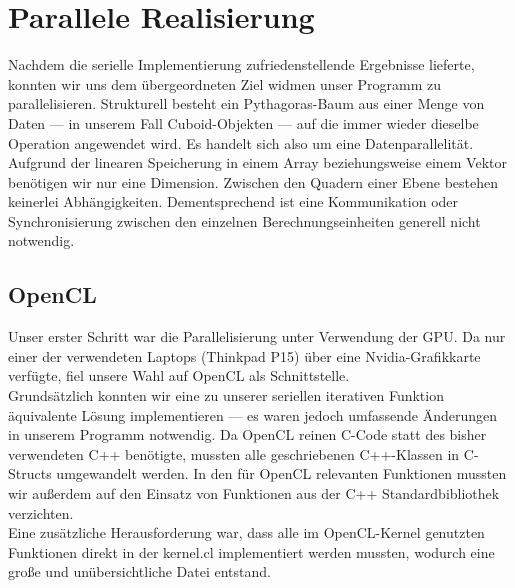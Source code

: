 \section{Parallele Realisierung}
Nachdem die serielle Implementierung zufriedenstellende Ergebnisse lieferte, konnten wir uns dem übergeordneten Ziel widmen unser 
Programm zu parallelisieren.\newline
Strukturell besteht ein Pythagoras-Baum aus einer Menge von Daten --- in unserem Fall Cuboid-Objekten ---
auf die immer wieder dieselbe Operation angewendet wird. Es handelt sich also um eine Datenparallelität. Aufgrund der linearen Speicherung
in einem Array beziehungsweise einem Vektor benötigen wir nur eine Dimension.\newline
Zwischen den Quadern einer Ebene bestehen keinerlei Abhängigkeiten. Dementsprechend ist eine Kommunikation oder Synchronisierung zwischen den einzelnen
Berechnungseinheiten generell nicht notwendig. 

\subsection{OpenCL}
\vspace{-0.25cm}
Unser erster Schritt war die Parallelisierung unter Verwendung der GPU. Da nur einer der verwendeten Laptops (Thinkpad P15) über eine 
Nvidia-Grafikkarte verfügte, fiel unsere Wahl auf OpenCL als Schnittstelle.\\
Grundsätzlich konnten wir eine zu unserer seriellen iterativen Funktion äquivalente Lösung implementieren --- es waren jedoch umfassende
Änderungen in unserem Programm notwendig. Da OpenCL reinen C-Code statt des bisher verwendeten C++ benötigte, mussten alle geschriebenen
C++-Klassen in C-Structs umgewandelt werden. In den für OpenCL relevanten Funktionen mussten wir außerdem auf den Einsatz von Funktionen
aus der C++ Standardbibliothek verzichten. \\
Eine zusätzliche Herausforderung war, dass alle im OpenCL-Kernel genutzten Funktionen direkt in der kernel.cl implementiert werden
mussten, wodurch eine große und unübersichtliche Datei entstand. 

